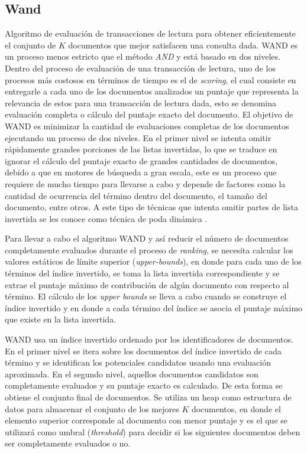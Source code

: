 \subsection{Wand}
\label{marco:wand}
Algoritmo de evaluación de transacciones de lectura para obtener eficientemente el conjunto de $K$ documentos que mejor satisfacen una consulta dada. WAND \citep{Broder:2003} es un proceso menos estricto que el método \textit{AND} y está basado en dos niveles. Dentro del proceso de evaluación de una transacción de lectura, uno de los procesos más costosos en términos de tiempo es el de \textit{scoring}, el cual consiste en entregarle a cada uno de los documentos analizados un puntaje que representa la relevancia de estos para una transacción de lectura dada, esto se denomina evaluación completa o cálculo del puntaje exacto del documento. El objetivo de WAND es minimizar la cantidad de evaluaciones completas de los documentos ejecutando un proceso de dos niveles. En el primer nivel se intenta omitir rápidamente grandes porciones de las listas invertidas, lo que se traduce en ignorar el cálculo del puntaje exacto de grandes cantidades de documentos, debido a que en motores de búsqueda a gran escala, este es un proceso que requiere de mucho tiempo para llevarse a cabo y depende de factores como la cantidad de ocurrencia del término dentro del documento, el tamaño del documento, entre otros. A este tipo de técnicas que intenta omitir partes de lista invertida se les conoce como técnica de poda dinámica \citep{Broder:2003, Persin:1994, Turtle:1995}. 

Para llevar a cabo el algoritmo WAND y así reducir el número de documentos completamente evaluados durante el proceso de \textit{ranking}, se necesita calcular los valores estáticos de límite superior (\textit{upper-bounds}), en donde para cada uno de los términos del índice invertido, se toma la lista invertida correspondiente y se extrae el puntaje máximo de contribución de algún documento con respecto al término. El cálculo de los \textit{upper bounds} se lleva a cabo cuando se construye el índice invertido y en donde a cada término del índice se asocia el puntaje máximo que existe en la lista invertida. 

WAND usa un índice invertido ordenado por los identificadores de documentos. En el primer nivel se itera sobre los documentos del índice invertido de cada término y se identifican los potenciales candidatos usando una evaluación aproximada. En el segundo nivel, aquellos documentos candidatos son completamente evaluados y su puntaje exacto es calculado. De esta forma se obtiene el conjunto final de documentos. Se utiliza un heap como estructura de datos para almacenar el conjunto de los mejores $K$ documentos, en donde el elemento superior corresponde al documento con menor puntaje y es el que se utilizará como umbral (\textit{threshold}) para decidir si los siguientes documentos deben ser completamente evaluados o no.

